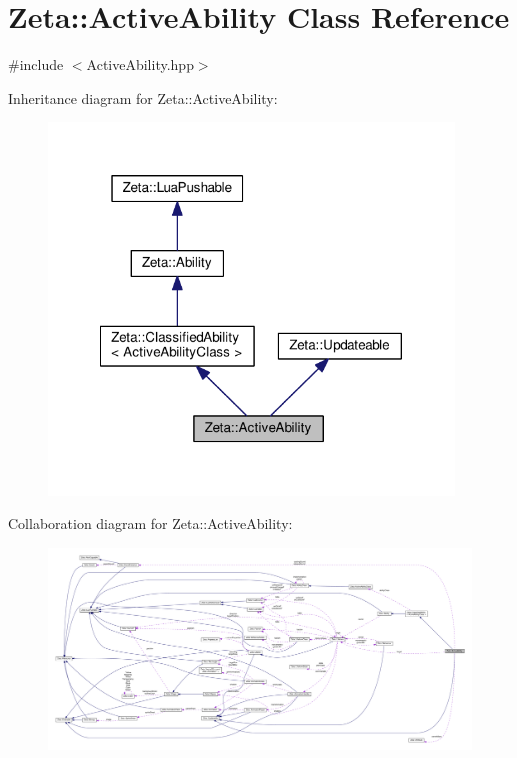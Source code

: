 \hypertarget{classZeta_1_1ActiveAbility}{\section{Zeta\+:\+:Active\+Ability Class Reference}
\label{classZeta_1_1ActiveAbility}
}


{\ttfamily \#include $<$Active\+Ability.\+hpp$>$}



Inheritance diagram for Zeta\+:\+:Active\+Ability\+:\nopagebreak
\begin{figure}[H]
\begin{center}
\leavevmode
\includegraphics[width=305pt]{classZeta_1_1ActiveAbility__inherit__graph}
\end{center}
\end{figure}


Collaboration diagram for Zeta\+:\+:Active\+Ability\+:
\nopagebreak
\begin{figure}[H]
\begin{center}
\leavevmode
\includegraphics[width=350pt]{classZeta_1_1ActiveAbility__coll__graph}
\end{center}
\end{figure}
